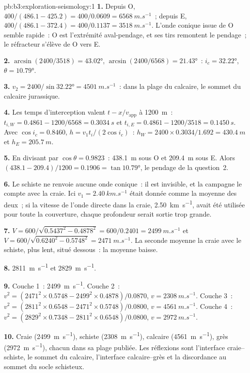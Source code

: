 \begin{solution}{pb:b3:exploration-seismology:1}
\textbf{1.} Depuis O, $400/(486.1 - 425.2) = 400/0.0609 = \qty{6568}{m.s^{-1}}$~;
depuis E, $400/(486.1 - 372.4) = 400/0.1137 = \qty{3518}{m.s^{-1}}$. L'onde
conique issue de O semble rapide~: O est l'extrémité aval-pendage, et ses tirs
remontent le pendage~; le réfracteur s'élève de O vers E.

\textbf{2.} $\arcsin(2400/3518) = \ang{43.02}$, $\arcsin(2400/6568) =
\ang{21.43}$~: $i_c = \ang{32.22}$, $\theta = \ang{10.79}$.

\textbf{3.} $v_2 = 2400/\sin\ang{32.22} = \qty{4501}{m.s^{-1}}$~: dans la
plage du calcaire, le sommet du calcaire jurassique.

\textbf{4.} Les temps d'interception valent $t - x/v_{\text{app}}$ à \qty{1200}{m}~:
$t_{i,W} = 0.4861 - 1200/6568 = \qty{0.3034}{s}$ et $t_{i,E} = 0.4861 -
1200/3518 = \qty{0.1450}{s}$. Avec $\cos i_c = 0.8460$, $h = v_1t_i/(2\cos
i_c)$~: $h_W = 2400\times0.3034/1.692 = \qty{430.4}{m}$ et $h_E =
\qty{205.7}{m}$.

\textbf{5.} En divisant par $\cos\theta = 0.9823$~: \qty{438.1}{m} sous O et
\qty{209.4}{m} sous E. Alors $(438.1 - 209.4)/1200 = 0.1906 =
\tan\ang{10.79}$, le pendage de la question~2.

\textbf{6.} Le schiste ne renvoie aucune onde conique~: il est invisible, et la
campagne le compte avec la craie. Ici $v_1 = \qty{2.40}{km.s^{-1}}$ était donnée
comme la moyenne des deux~; si la vitesse de l'onde directe dans la craie, \qty{2.50}{km.s^{-1}},
avait été utilisée pour toute la couverture, chaque profondeur serait sortie trop grande.

\textbf{7.} $V = 600/\sqrt{0.5437^2 - 0.4878^2} = 600/0.2401 =
\qty{2499}{m.s^{-1}}$ et $V = 600/\sqrt{0.6240^2 - 0.5748^2} =
\qty{2471}{m.s^{-1}}$. La seconde moyenne la craie avec le schiste, plus lent,
situé dessous~: la moyenne baisse.

\textbf{8.} \qty{2811}{m.s^{-1}} et \qty{2829}{m.s^{-1}}.

\textbf{9.} Couche 1~: \qty{2499}{m.s^{-1}}. Couche 2~: $v^2 = (2471^2\times0.5748
- 2499^2\times0.4878)/0.0870$, $v = \qty{2308}{m.s^{-1}}$. Couche 3~:
$v^2 = (2811^2\times0.6548 - 2471^2\times0.5748)/0.0800$,
$v = \qty{4561}{m.s^{-1}}$. Couche 4~: $v^2 = (2829^2\times0.7348 -
2811^2\times0.6548)/0.0800$, $v = \qty{2972}{m.s^{-1}}$.

\textbf{10.} Craie (\qty{2499}{m.s^{-1}}), schiste (\qty{2308}{m.s^{-1}}),
calcaire (\qty{4561}{m.s^{-1}}), grès (\qty{2972}{m.s^{-1}}), chacun dans sa
plage publiée. Les réflexions sont l'interface craie--schiste, le sommet
du calcaire, l'interface calcaire--grès et la discordance au
sommet du socle schisteux.


\end{solution}
